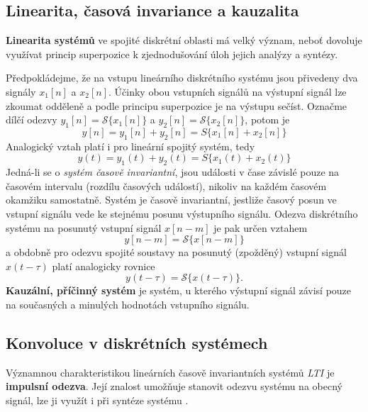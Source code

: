     \subsection{Linearita, časová invariance a kauzalita}\label{tky:IchIIsecIssecI}
      \textbf{Linearita systémů} ve spojité diskrétní oblasti má velký význam, neboť dovoluje
      využívat princip superpozice k zjednodušování úloh jejich analýzy  a syntézy.

      Předpokládejme, že na vstupu lineárního diskrétního systému jsou přivedeny dva signály
      $x_1[n]$ a $x_2[n]$. Účinky obou vstupních signálů na výstupní signál lze zkoumat odděleně a
      podle principu superpozice je na výstupu sečíst. Označme dílčí odezvy
      $y_1[n]=\mathcal{S}\{x_1[n]\}$ a $y_2[n]=\mathcal{S}\{x_2 [n]\}$, potom je
      \begin{equation}\label{tky:eq007}
        y[n]= y_1[n]+y_2[n]=S\{x_1[n]+x_2[n]\}
      \end{equation}
      Analogický vztah platí i pro lineární spojitý systém, tedy
      \begin{equation}\label{tky:eq008}
        y(t)= y_1(t)+ y_2(t)=S\{x_1(t)+x_2(t)\}
      \end{equation}
      Jedná-li se o \emph{systém časově invariantní}, jsou události v čase závislé pouze na časovém
      intervalu (rozdílu časových událostí), nikoliv na každém časovém okamžiku samostatně.
      Systém je časově invariantní, jestliže časový posun ve vstupní signálu vede ke stejnému posunu
      výstupního signálu. Odezva diskrétního systému na posunutý vstupní signál $x[n-m]$ je pak
      určen vztahem
      \begin{equation}\label{tky:eq009}
        y[n-m]= \mathcal{S}\{x[n-m]\}
      \end{equation}
      a obdobně pro odezvu spojité soustavy na posunutý (zpožděný) vstupní signál $x(t-\tau)$ platí
      analogicky rovnice
      \begin{equation}\label{tky:eq010}
        y(t-\tau)= \mathcal{S}\{x(t-\tau)\}.
      \end{equation}
      \textbf{Kauzální, příčinný systém} je systém, u kterého výstupní signál závisí pouze na
      současných a minulých hodnotách vstupního signálu.

    \subsection{Konvoluce v diskrétních systémech}\label{tky:IchIIsecIssecII}
      Významnou charakteristikou lineárních časově invariantních systémů \emph{LTI} je
      \textbf{impulsní odezva}. Její znalost umožňuje stanovit odezvu systému na obecný signál, lze 
      ji využít i při syntéze systému \cite{Bicak2007}.

